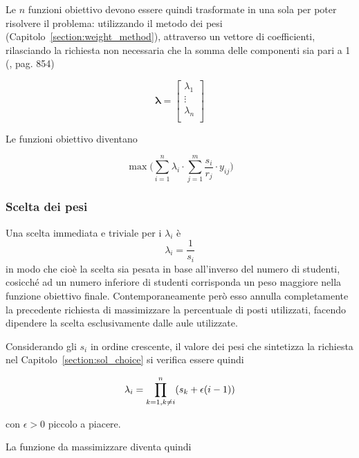 Le $n$ funzioni obiettivo devono essere quindi trasformate in una sola per poter risolvere il problema:
utilizzando il metodo dei pesi (Capitolo~\ref{section:weight_method}), attraverso un vettore di coefficienti,
rilasciando la richiesta non necessaria che la somma delle componenti sia pari a 1
(\cite{Marler2009}, pag. 854)

\begin{equation*}
    \mathbf{\lambda} = \begin{bmatrix}
        \lambda_1 \\
        \vdots \\
        \lambda_n \\
    \end{bmatrix}
    \label{eq:}
\end{equation*}
 
Le funzioni obiettivo diventano

\begin{equation}
    \max \bigg( \sum_{i=1}^{n} \lambda_{i} \cdot \sum_{j = 1}^{m}\frac{s_i}{r_j} \cdot y_{ij}\bigg)
    \label{eq:}
\end{equation}

\subsubsection{Scelta dei pesi}
Una scelta immediata e triviale per i $\lambda_i$ è
\begin{equation}
    \lambda_i = \frac{1}{s_i}
    \label{eq:}
\end{equation}
in modo che cioè la scelta sia pesata in base all'inverso del numero di studenti, 
cosicché ad un numero inferiore di studenti corrisponda un peso maggiore nella
funzione obiettivo finale. Contemporaneamente però esso annulla completamente
la precedente richiesta di massimizzare la percentuale di posti utilizzati, 
facendo dipendere la scelta esclusivamente dalle aule utilizzate.

Considerando gli $s_i$ in ordine crescente, il valore dei pesi che sintetizza la richiesta 
nel Capitolo~\ref{section:sol_choice} si verifica essere quindi

\begin{equation}
    \lambda_i = \prod_{k=1,\\ k\neq i}^{n} (s_k + \epsilon (i -1))
    \label{eq:}
\end{equation}

\noindent
con $\epsilon > 0$ piccolo a piacere.

La funzione da massimizzare diventa quindi

